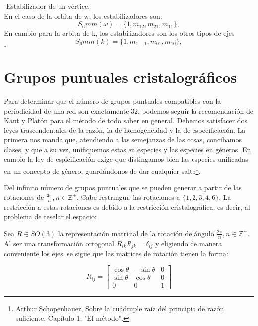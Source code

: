\documentclass{report}
\begin{document}
\vspace{.2cm}

-Estabilizador de un vértice.\\
\vspace{.2cm}
En el caso de la orbita de w, los estabilizadores son:
\[
S_6mm(\omega)
=\{1,m_{12},m_{21},m_{11}\},
\]
En cambio para la orbita de k, los estabilizadores son los otros tipos de ejes
\[
S_6mm(k)
=\{1,m_{1-1},m_{01},m_{10}\},
\]
\hfill $\square$
\newpage

\section{Grupos puntuales cristalográficos}

Para determinar que el número de grupos puntuales compatibles con la periodicidad de una red son exactamente 32, podemos seguir la recomendación de Kant y Platón para el método de todo saber en general. Debemos satisfacer dos leyes trascendentales de la razón, la de homogeneidad y la de especificación. La primera nos manda que, atendiendo a las semejanzas de las cosas, concibamos clases, y que a su vez, unifiquemos estas en especies y las especies en géneros. En cambio la ley de espicificación exige que distingamos bien las especies unificadas en un concepto de género, guardándonos de dar cualquier salto\footnote{Arthur Schopenhauer, Sobre la cuádruple raíz del principio de razón suficiente, Capítulo 1: "El método".}.\\
\vspace{.2cm}

Del infinito número de grupos puntuales que se pueden  generar a partir de las rotaciones de $\frac{2\pi}{n}, n\in \mathbb{Z}^+$. Cabe restringuir  las rotaciones a $\{1,2,3,4,6\}$. 
La restricción a estas rotaciones es debido a la restricción cristalográfica, es decir, al problema de teselar el espacio:\\
\vspace{.2cm}



Sea $R\in SO(3)$ la representación matricial de la rotación de ángulo $\frac{2\pi}{n}, n\in \mathbb{Z}^+$. Al ser una transformación ortogonal $R_{ik}R_{jk}=\delta_{ij}$ y eligiendo de manera conveniente los ejes, se sigue que las matrices de rotación tienen la forma:


\[
R_{ij} =
\begin{bmatrix}
\cos\theta & -\sin\theta & 0 \\ 
\sin\theta & \cos\theta & 0 \\ 
0 & 0 & 1
\end{bmatrix}
\]
\end{document}
